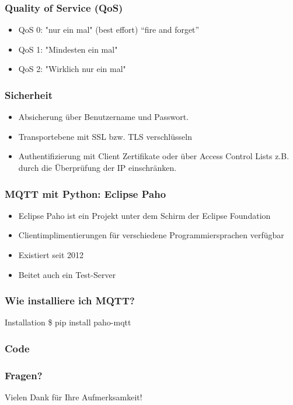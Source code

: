 \documentclass[11pt]{beamer}
\begin{document}
\begin{frame}
	\frametitle{Quality of Service (QoS)} 
	\begin{itemize}
		\item QoS 0: "nur ein mal" (best effort) “fire and forget”
		\item QoS 1: "Mindesten ein mal"
		\item QoS 2: "Wirklich nur ein mal"
	\end{itemize}
\end{frame}

\begin{frame}
	\frametitle{Sicherheit}
	\begin{itemize}
		\item Absicherung über Benutzername und Passwort.
		\item Transportebene mit SSL bzw. TLS verschlüsseln
		\item Authentifizierung mit Client Zertifikate oder über Access Control Lists z.B. durch die Überprüfung der IP einschränken.
	\end{itemize}
\end{frame}

\begin{frame}
	\frametitle{MQTT mit Python: Eclipse Paho} 
	\begin{itemize}
		\item Eclipse Paho ist ein Projekt unter dem Schirm der Eclipse Foundation
		\item Clientimplimentierungen für verschiedene Programmiersprachen verfügbar
		\item Existiert seit 2012
		\item Beitet auch ein Test-Server 
	\end{itemize}
\end{frame}

\begin{frame}
	\frametitle{Wie installiere ich MQTT?} 
		\begin{exampleblock}
		{Installation} \$ pip install paho-mqtt
	\end{exampleblock}
\end{frame}

\begin{frame}
	\frametitle{Code} 
\end{frame}

\begin{frame}
	\frametitle{Fragen?}
	\begin{center}
		Vielen Dank für Ihre Aufmerksamkeit!
	\end{center}
\end{frame}
\end{document}
